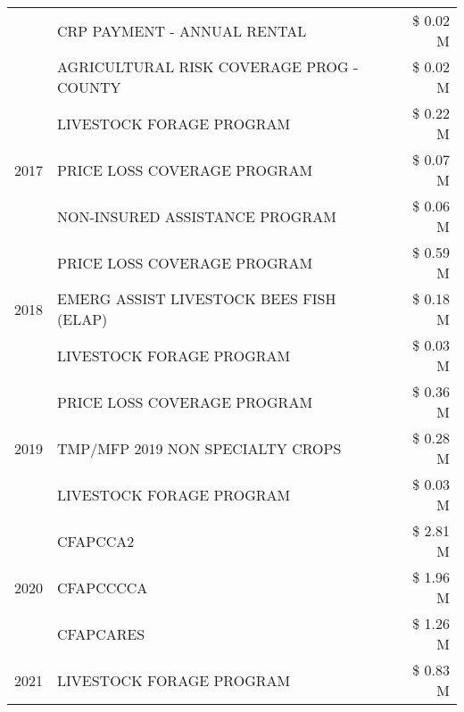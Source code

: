 \begin{tabular}{llr}
 & CRP PAYMENT - ANNUAL RENTAL & \$ 0.02 M \\
 & AGRICULTURAL RISK COVERAGE PROG - COUNTY & \$ 0.02 M \\
\cline{1-3}
\multirow[t]{3}{*}{2017} & LIVESTOCK FORAGE PROGRAM & \$ 0.22 M \\
 & PRICE LOSS COVERAGE PROGRAM & \$ 0.07 M \\
 & NON-INSURED ASSISTANCE PROGRAM & \$ 0.06 M \\
\cline{1-3}
\multirow[t]{3}{*}{2018} & PRICE LOSS COVERAGE PROGRAM & \$ 0.59 M \\
 & EMERG ASSIST LIVESTOCK BEES FISH (ELAP) & \$ 0.18 M \\
 & LIVESTOCK FORAGE PROGRAM & \$ 0.03 M \\
\cline{1-3}
\multirow[t]{3}{*}{2019} & PRICE LOSS COVERAGE PROGRAM & \$ 0.36 M \\
 & TMP/MFP 2019 NON SPECIALTY CROPS & \$ 0.28 M \\
 & LIVESTOCK FORAGE PROGRAM & \$ 0.03 M \\
\cline{1-3}
\multirow[t]{3}{*}{2020} & CFAPCCA2 & \$ 2.81 M \\
 & CFAPCCCCA & \$ 1.96 M \\
 & CFAPCARES & \$ 1.26 M \\
\cline{1-3}
2021 & LIVESTOCK FORAGE PROGRAM & \$ 0.83 M \\
\cline{1-3}
\bottomrule
\end{tabular}
